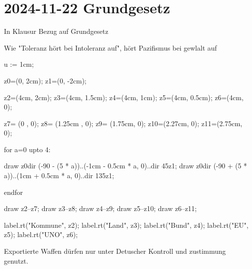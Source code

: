 \section{2024-11-22 Grundgesetz}

\startframedtipp
In Klausur Bezug auf Grundgesetz
\stopframedtipp

Wie "Toleranz hört bei Intoleranz auf", hört Pazifismus bei gewlalt auf


\startdefinition[title={Subsidiaritätsprinzip}]

\startMPpage

u := 1cm;

z0=(0, 2cm);
z1=(0, -2cm);

z2=(4cm, 2cm);
z3=(4cm, 1.5cm);
z4=(4cm, 1cm);
z5=(4cm, 0.5cm);
z6=(4cm, 0);

z7= (0    , 0);
z8= (1.25cm  , 0);
z9= (1.75cm, 0);
z10=(2.27cm, 0);
z11=(2.75cm, 0);

for a=0 upto 4:

	draw z0{dir (-90 - (5 * a))}..(-1cm - 0.5cm * a, 0)..{dir 45}z1;
	draw z0{dir (-90 + (5 * a))}..(1cm + 0.5cm * a, 0)..{dir 135}z1;

endfor

draw z2--z7;
draw z3--z8;
draw z4--z9;
draw z5--z10;
draw z6--z11;

label.rt("Kommune", z2);
label.rt("Land", z3);
label.rt("Bund", z4);
label.rt("EU", z5);
label.rt("UNO", z6);

\stopMPpage
\stopbuffer

\stopdefinition

\startframedtipp
Exportierte Waffen dürfen nur unter Detuscher Kontroll und zustimmung genutzt.
\stopframedtipp
